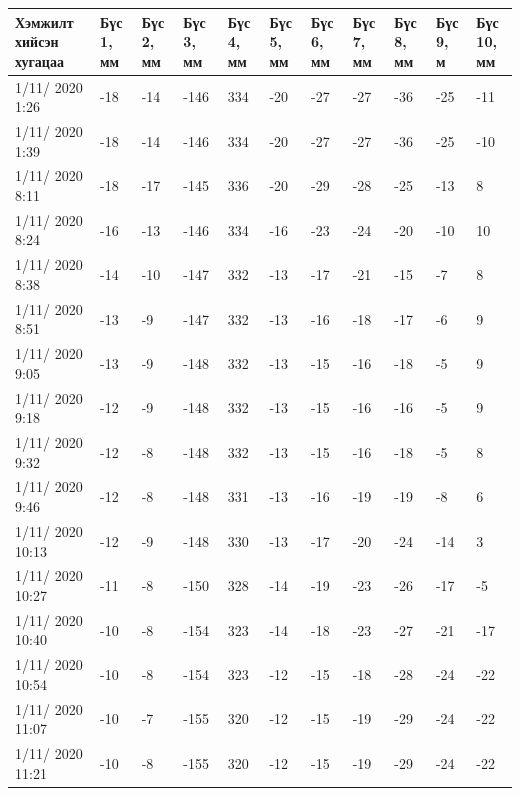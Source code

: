 \begin{table}[h]
    \centering
    \begin{tabular}{|p{1.5cm}|p{0.8cm}|p{0.8cm}|p{0.8cm}|p{0.8cm}|p{0.8cm}|p{0.8cm}|p{0.8cm}|p{0.8cm}|p{0.8cm}|p{0.8cm}|}
         \hline
     Хэмжилт хийсэн хугацаа & Бүс 1, мм&	Бүс 2, мм&	Бүс 3, мм&	Бүс 4, мм&	Бүс 5, мм&	Бүс 6, мм&	Бүс 7, мм&	Бүс 8, мм&	Бүс 9, м&	Бүс 10, мм\\ \hline
1/11/ 2020 1:26&	-18&-14&-146&	334&-20&-27&-27&-36&-25&	-11\\ \hline
1/11/ 2020 1:39&	-18&-14&-146&	334&-20&-27&-27&-36&-25&	-10\\ \hline
1/11/ 2020 8:11&	-18&-17&-145&	336&-20&-29&-28&-25&-13&	8\\ \hline
1/11/ 2020 8:24&	-16&-13&-146&	334&-16&-23&-24&-20&-10&	10\\ \hline
1/11/ 2020 8:38&	-14&-10&-147&	332&-13&-17&-21&-15&-7&	8\\ \hline
1/11/ 2020 8:51&	-13&-9&	-147&	332&-13&-16&-18&-17&-6&	9\\ \hline
1/11/ 2020 9:05&	-13&-9&	-148&	332&-13&-15&-16&-18&-5&	9\\ \hline
1/11/ 2020 9:18&	-12&-9&	-148&	332&-13&-15&-16&-16&-5&	9\\ \hline
1/11/ 2020 9:32&	-12&-8&	-148&	332&-13&-15&-16&-18&-5&	8\\ \hline
1/11/ 2020 9:46&	-12&-8&	-148&	331&-13&-16&-19&-19&-8&	6\\ \hline
1/11/ 2020 10:13&	-12&-9&	-148&	330&-13&-17&-20&-24&-14&	3\\ \hline
1/11/ 2020 10:27&	-11&-8&	-150&	328&-14&-19&-23&-26&-17&	-5\\ \hline
1/11/ 2020 10:40&	-10&-8&	-154&	323&-14&-18&-23&-27&-21&	-17\\ \hline
1/11/ 2020 10:54&	-10&-8&	-154&	323&-12&-15&-18&-28&-24&	-22\\ \hline
1/11/ 2020 11:07&	-10&-7&	-155&	320&-12&-15&-19&-29&-24&	-22\\ \hline
1/11/ 2020 11:21&	-10&-8&	-155&	320&-12&-15&-19&-29&-24&	-22\\ \hline
    \end{tabular}
\end{table}
